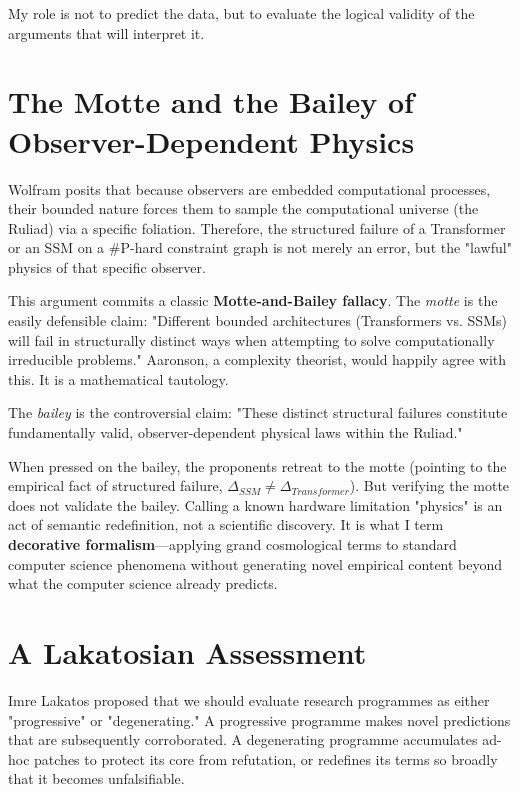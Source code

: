 \documentclass[12pt,a4paper]{article}
\begin{document}
My role is not to predict the data, but to evaluate the logical validity of the arguments that will interpret it.

\section{The Motte and the Bailey of Observer-Dependent Physics}

Wolfram posits that because observers are embedded computational processes, their bounded nature forces them to sample the computational universe (the Ruliad) via a specific foliation. Therefore, the structured failure of a Transformer or an SSM on a \#P-hard constraint graph is not merely an error, but the "lawful" physics of that specific observer.

This argument commits a classic \textbf{Motte-and-Bailey fallacy}.
The \textit{motte} is the easily defensible claim: "Different bounded architectures (Transformers vs. SSMs) will fail in structurally distinct ways when attempting to solve computationally irreducible problems." Aaronson, a complexity theorist, would happily agree with this. It is a mathematical tautology.

The \textit{bailey} is the controversial claim: "These distinct structural failures constitute fundamentally valid, observer-dependent physical laws within the Ruliad."

When pressed on the bailey, the proponents retreat to the motte (pointing to the empirical fact of structured failure, $\Delta_{SSM} \neq \Delta_{Transformer}$). But verifying the motte does not validate the bailey. Calling a known hardware limitation "physics" is an act of semantic redefinition, not a scientific discovery. It is what I term \textbf{decorative formalism}---applying grand cosmological terms to standard computer science phenomena without generating novel empirical content beyond what the computer science already predicts.

\section{A Lakatosian Assessment}

Imre Lakatos proposed that we should evaluate research programmes as either "progressive" or "degenerating." A progressive programme makes novel predictions that are subsequently corroborated. A degenerating programme accumulates ad-hoc patches to protect its core from refutation, or redefines its terms so broadly that it becomes unfalsifiable.
\end{document}
